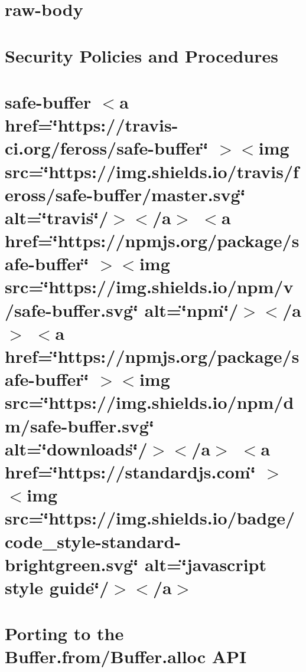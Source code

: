 \documentclass[twoside]{book}
\newcommand{\+}{\discretionary{\mbox{\scriptsize$\hookleftarrow$}}{}{}}
\begin{document}
\chapter{raw-\/body}
\label{md_src_nodejs_node_modules_raw_body_README}

\chapter{Security Policies and Procedures}
\label{md_src_nodejs_node_modules_raw_body_SECURITY}

\chapter{safe-\/buffer \texorpdfstring{$<$}{<}a href=\char`\"{}https\+://travis-\/ci.\+org/feross/safe-\/buffer\char`\"{} \texorpdfstring{$>$}{>}\texorpdfstring{$<$}{<}img src=\char`\"{}https\+://img.\+shields.\+io/travis/feross/safe-\/buffer/master.\+svg\char`\"{} alt=\char`\"{}travis\char`\"{}/\texorpdfstring{$>$}{>}\texorpdfstring{$<$}{<}/a\texorpdfstring{$>$}{>} \texorpdfstring{$<$}{<}a href=\char`\"{}https\+://npmjs.\+org/package/safe-\/buffer\char`\"{} \texorpdfstring{$>$}{>}\texorpdfstring{$<$}{<}img src=\char`\"{}https\+://img.\+shields.\+io/npm/v/safe-\/buffer.\+svg\char`\"{} alt=\char`\"{}npm\char`\"{}/\texorpdfstring{$>$}{>}\texorpdfstring{$<$}{<}/a\texorpdfstring{$>$}{>} \texorpdfstring{$<$}{<}a href=\char`\"{}https\+://npmjs.\+org/package/safe-\/buffer\char`\"{} \texorpdfstring{$>$}{>}\texorpdfstring{$<$}{<}img src=\char`\"{}https\+://img.\+shields.\+io/npm/dm/safe-\/buffer.\+svg\char`\"{} alt=\char`\"{}downloads\char`\"{}/\texorpdfstring{$>$}{>}\texorpdfstring{$<$}{<}/a\texorpdfstring{$>$}{>} \texorpdfstring{$<$}{<}a href=\char`\"{}https\+://standardjs.\+com\char`\"{} \texorpdfstring{$>$}{>}\texorpdfstring{$<$}{<}img src=\char`\"{}https\+://img.\+shields.\+io/badge/code\+\_\+style-\/standard-\/brightgreen.\+svg\char`\"{} alt=\char`\"{}javascript style guide\char`\"{}/\texorpdfstring{$>$}{>}\texorpdfstring{$<$}{<}/a\texorpdfstring{$>$}{>}}
\label{md_src_nodejs_node_modules_safe_buffer_README}

\chapter{Porting to the Buffer.\+from/\+Buffer.alloc API}
\label{md_src_nodejs_node_modules_safer_buffer_Porting_Buffer}

\end{document}
